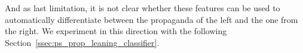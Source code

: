 And as last limitation, it is not clear whether these features can be used to automatically differentiate between the propaganda of the left and the one from the right. We experiment in this direction with the following Section~\ref{ssec:ps_prop_leaning_classifier}.





